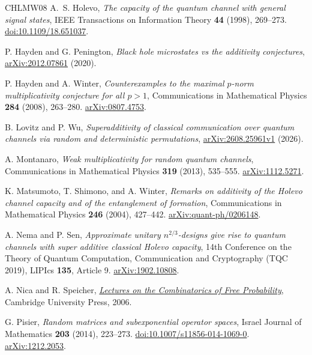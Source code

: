 \documentclass[11pt]{article}
\numberwithin{equation}{section}
\theoremstyle{boldremark}\newtheorem{remark}[theorem]{Remark}
\begin{document}
\begin{thebibliography}{CHLMW08}
A.~S. Holevo,
\emph{The capacity of the quantum channel with general signal states},
IEEE Transactions on Information Theory \textbf{44} (1998), 269--273.
\href{https://doi.org/10.1109/18.651037}{doi:10.1109/18.651037}.

P. Hayden and G. Penington,
\emph{Black hole microstates vs the additivity conjectures},
\href{https://arxiv.org/abs/2012.07861}{arXiv:2012.07861} (2020).

P. Hayden and A. Winter,
\emph{Counterexamples to the maximal $p$-norm multiplicativity conjecture
for all $p>1$},
Communications in Mathematical Physics \textbf{284} (2008), 263--280.
\href{https://arxiv.org/abs/0807.4753}{arXiv:0807.4753}.

B. Lovitz and P. Wu,
\emph{Superadditivity of classical communication over quantum channels
via random and deterministic permutations},
\href{https://arxiv.org/abs/2608.25961v1}{arXiv:2608.25961v1} (2026).

A. Montanaro,
\emph{Weak multiplicativity for random quantum channels},
Communications in Mathematical Physics \textbf{319} (2013), 535--555.
\href{https://arxiv.org/abs/1112.5271}{arXiv:1112.5271}.

K. Matsumoto, T. Shimono, and A. Winter,
\emph{Remarks on additivity of the Holevo channel capacity and of the entanglement of formation},
Communications in Mathematical Physics \textbf{246} (2004), 427--442.
\href{https://arxiv.org/abs/quant-ph/0206148}{arXiv:quant-ph/0206148}.

A. Nema and P. Sen,
\emph{Approximate unitary $n^{2/3}$-designs give rise to quantum channels with super additive classical Holevo capacity},
14th Conference on the Theory of Quantum Computation, Communication and Cryptography (TQC 2019), LIPIcs \textbf{135}, Article 9.
\href{https://arxiv.org/abs/1902.10808}{arXiv:1902.10808}.

A. Nica and R. Speicher,
\href{https://rolandspeicher.com/wp-content/uploads/2020/06/nica-speicher-book.pdf}{\emph{Lectures on the Combinatorics of Free Probability}},
Cambridge University Press, 2006.

G. Pisier,
\emph{Random matrices and subexponential operator spaces},
Israel Journal of Mathematics \textbf{203} (2014), 223--273.
\href{https://doi.org/10.1007/s11856-014-1069-0}{doi:10.1007/s11856-014-1069-0}.
\href{https://arxiv.org/abs/1212.2053}{arXiv:1212.2053}.


\end{thebibliography}
\end{document}
